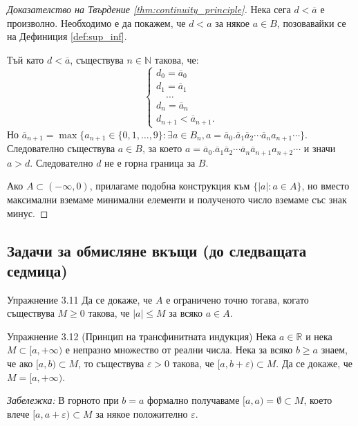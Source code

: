 \begin{proof}[Доказателство на Твърдение \ref{thm:continuity_principle}]
Нека сега $d < \overline{a}$ е произволно. Необходимо е да покажем, че $d < a$ за някое $a \in B$, позовавайки се на Дефиниция \ref{def:sup_inf}.

Тъй като $d < \overline{a}$, съществува $n \in \mathbb{N}$ такова, че:
\[
\begin{cases}
d_0 = \overline{a}_0 \\
d_1 = \overline{a}_1 \\
\quad \dots \\
d_n = \overline{a}_n \\
d_{n+1} < \overline{a}_{n+1}.
\end{cases}
\]
Но $\overline{a}_{n+1} = \max \{a_{n+1} \in \{0, 1, \dots, 9\} : \exists a \in B_n, a = \overline{a}_0.\overline{a}_1\overline{a}_2\cdots\overline{a}_n a_{n+1}\cdots\}$. Следователно съществува $a \in B$, за което $a = \overline{a}_0.\overline{a}_1\overline{a}_2\cdots\overline{a}_n \overline{a}_{n+1} a_{n+2}\cdots$ и значи $a > d$. Следователно $d$ не е горна граница за $B$.

Ако $A \subset (-\infty, 0)$, прилагаме подобна конструкция към $\{|a| : a \in A\}$, но вместо максимални вземаме минимални елементи и полученото число вземаме със знак минус.
\end{proof}

\subsection*{Задачи за обмисляне вкъщи (до следващата седмица)}

\begin{problembox}{Упражнение 3.11}
Да се докаже, че $A$ е ограничено точно тогава, когато съществува $M \ge 0$ такова, че $|a| \le M$ за всяко $a \in A$.
\end{problembox}

\begin{problembox}{Упражнение 3.12 (Принцип на трансфинитната индукция)}
Нека $a \in \mathbb{R}$ и нека $M \subset [a, +\infty)$ е непразно множество от реални числа. Нека за всяко $b \ge a$ знаем, че ако $[a, b) \subset M$, то съществува $\varepsilon > 0$ такова, че $[a, b + \varepsilon) \subset M$. Да се докаже, че $M = [a, +\infty)$.

\textit{Забележка:} В горното при $b = a$ формално получаваме $[a, a) = \emptyset \subset M$, което влече $[a, a + \varepsilon) \subset M$ за някое положително $\varepsilon$.
\end{problembox}